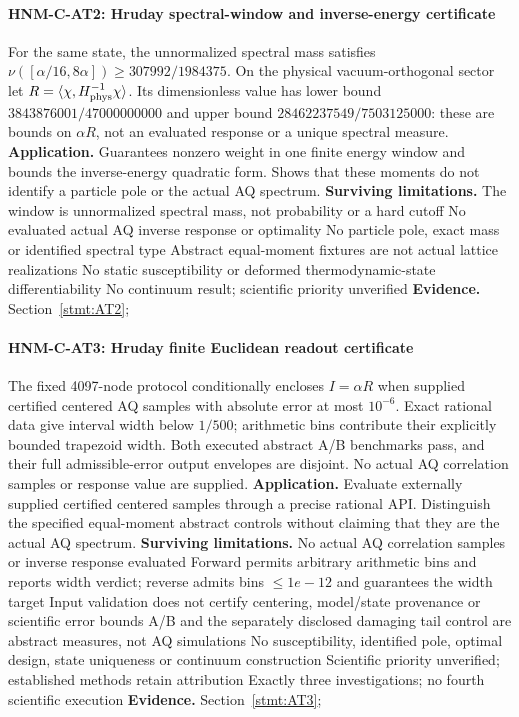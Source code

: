 \paragraph{HNM-C-AT2: Hruday spectral-window and inverse-energy certificate} For the same state, the unnormalized spectral mass satisfies $\nu([\alpha/16,8\alpha])\ge307992/1984375$. On the physical vacuum-orthogonal sector let $R=\langle\chi,H_{\rm phys}^{-1}\chi\rangle$. Its dimensionless value has lower bound $3843876001/47000000000$ and upper bound $28462237549/7503125000$: these are bounds on $\alpha R$, not an evaluated response or a unique spectral measure.
\textbf{Application.} Guarantees nonzero weight in one finite energy window and bounds the inverse-energy quadratic form. Shows that these moments do not identify a particle pole or the actual AQ spectrum.
\textbf{Surviving limitations.} The window is unnormalized spectral mass, not probability or a hard cutoff No evaluated actual AQ inverse response or optimality No particle pole, exact mass or identified spectral type Abstract equal-moment fixtures are not actual lattice realizations No static susceptibility or deformed thermodynamic-state differentiability No continuum result; scientific priority unverified
\textbf{Evidence.} Section~\ref{stmt:AT2}; 

\paragraph{HNM-C-AT3: Hruday finite Euclidean readout certificate} The fixed 4097-node protocol conditionally encloses $I=\alpha R$ when supplied certified centered AQ samples with absolute error at most $10^{-6}$. Exact rational data give interval width below $1/500$; arithmetic bins contribute their explicitly bounded trapezoid width. Both executed abstract A/B benchmarks pass, and their full admissible-error output envelopes are disjoint. No actual AQ correlation samples or response value are supplied.
\textbf{Application.} Evaluate externally supplied certified centered samples through a precise rational API. Distinguish the specified equal-moment abstract controls without claiming that they are the actual AQ spectrum.
\textbf{Surviving limitations.} No actual AQ correlation samples or inverse response evaluated Forward permits arbitrary arithmetic bins and reports width verdict; reverse admits bins \(\le 1e-12\) and guarantees the width target Input validation does not certify centering, model/state provenance or scientific error bounds A/B and the separately disclosed damaging tail control are abstract measures, not AQ simulations No susceptibility, identified pole, optimal design, state uniqueness or continuum construction Scientific priority unverified; established methods retain attribution Exactly three investigations; no fourth scientific execution
\textbf{Evidence.} Section~\ref{stmt:AT3}; 
